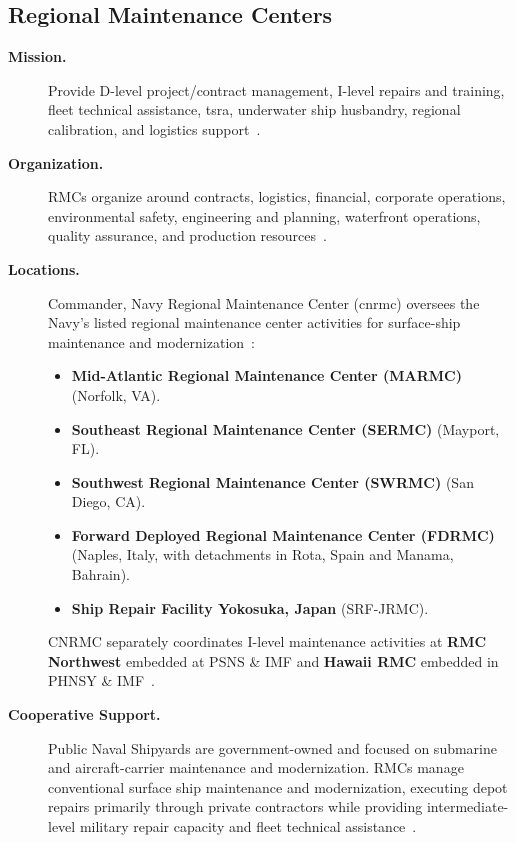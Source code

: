 \documentclass[../main.tex]{subfiles}
\begin{document}
\subsection{Regional Maintenance Centers}
\begin{description}
  \item[\textbf{Mission.}] Provide D-level project/contract management, I-level repairs and training, fleet technical assistance, \ac{tsra}, underwater ship husbandry, regional calibration, and logistics support~\autocite{edo-4-1-1-fleet-maint-assets-2025}.
  \item[\textbf{Organization.}] RMCs organize around contracts, logistics, financial, corporate operations, environmental safety, engineering and planning, waterfront operations, quality assurance, and production resources~\autocite{edo-4-1-1-fleet-maint-assets-2025}.
  \item[\textbf{Locations.}] Commander, Navy Regional Maintenance Center (\ac{cnrmc}) oversees the Navy's listed regional maintenance center activities for surface-ship maintenance and modernization~\autocite{NAVSEA-CNRMC-About-2026}:
    \begin{itemize}
      \item \textbf{Mid-Atlantic Regional Maintenance Center (MARMC)} (Norfolk, VA).
      \item \textbf{Southeast Regional Maintenance Center (SERMC)} (Mayport, FL).
      \item \textbf{Southwest Regional Maintenance Center (SWRMC)} (San Diego, CA).
      \item \textbf{Forward Deployed Regional Maintenance Center (FDRMC)} (Naples, Italy, with detachments in Rota, Spain and Manama, Bahrain).
      \item \textbf{Ship Repair Facility Yokosuka, Japan} (SRF-JRMC).
    \end{itemize}
    CNRMC separately coordinates I-level maintenance activities at \textbf{RMC Northwest} embedded at PSNS \& IMF and \textbf{Hawaii RMC} embedded in PHNSY \& IMF~\autocite{NAVSEA-CNRMC-About-2026}.
  \item[\textbf{Cooperative Support.}] Public Naval Shipyards are government-owned and focused on submarine and aircraft-carrier maintenance and modernization. RMCs manage conventional surface ship maintenance and modernization, executing depot repairs primarily through private contractors while providing intermediate-level military repair capacity and fleet technical assistance~\autocite{NAVSEA-Shipyards-SIOP-2026,NAVSEA-CNRMC-About-2026}.

\end{description}
\end{document}
